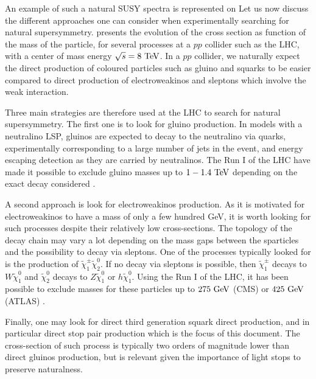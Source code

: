 
    An example of such a natural SUSY spectra is represented on
     Let us now discuss the different approaches
    one can consider when experimentally searching for natural supersymmetry.
     presents the evolution of the cross section
    as function of the mass of the particle, for several processes at a $pp$
    collider such as the LHC, with a center of mass energy $\sqrt{s} = 8~\text{TeV}$.
    In a $pp$ collider, we naturally expect the direct production of coloured
    particles such as gluino and squarks to be easier compared to direct
    production of electroweakinos and sleptons which involve the weak
    interaction.

    Three main strategies are therefore used at the LHC to search for natural
    supersymmetry.  The first one is to look for gluino production. In models
    with a neutralino LSP, gluinos are expected to decay to the neutralino via
    quarks, experimentally corresponding to a large number of jets in the event,
    and energy escaping detection as they are carried by neutralinos.  The Run I
    of the LHC have made it possible to exclude gluino masses up to $1-1.4~\text{TeV}$
    depending on the exact decay considered \cite{CMS-SUS-14-011, ATLASGluino}.

    A second approach is look for electroweakinos production. As it is motivated
    for electroweakinos to have a mass of only a few hundred GeV, it is worth
    looking for such processes despite their relatively low cross-sections. The
    topology of the decay chain may vary a lot depending on the mass gaps
    between the sparticles and the possibility to decay via sleptons. One of the
    processes typically looked for is the production of $\tilde{\chi}_1^\pm
    \tilde{\chi}_2^0$. If no decay via sleptons is possible, then
    $\tilde{\chi}_1^\pm$ decays to $W \tilde{\chi}_1^0$ and $\tilde{\chi}_2^0$
    decays to $Z \tilde{\chi}_1^0$ or $h \tilde{\chi}_1^0$. Using the Run I of
    the LHC, it has been possible to exclude masses for these particles up to
    $275~\text{GeV}$ (CMS) or $425~\text{GeV}$ (ATLAS) \cite{CMSEwkino, ATLASEwkino}.

    Finally, one may look for direct third generation squark direct production,
    and in particular direct stop pair production which is the focus of this
    document.  The cross-section of such process is typically two orders of
    magnitude lower than direct gluinos production, but is relevant given the
    importance of light stops to preserve naturalness.

